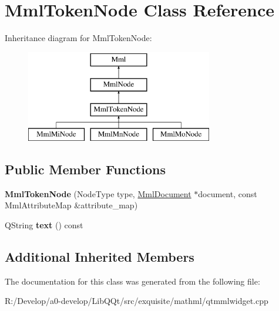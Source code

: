 \hypertarget{class_mml_token_node}{}\section{Mml\+Token\+Node Class Reference}
\label{class_mml_token_node}
Inheritance diagram for Mml\+Token\+Node\+:\begin{figure}[H]
\begin{center}
\leavevmode
\includegraphics[height=4.000000cm]{class_mml_token_node}
\end{center}
\end{figure}
\subsection*{Public Member Functions}
\begin{DoxyCompactItemize}
\item 
\mbox{\label{class_mml_token_node_ab7502878f01d33aca5f24a54fd884b11}} 
{\bfseries Mml\+Token\+Node} (Node\+Type type, \mbox{\hyperlink{class_mml_document}{Mml\+Document}} $\ast$document, const Mml\+Attribute\+Map \&attribute\+\_\+map)
\item 
\mbox{\label{class_mml_token_node_ac2caac4c9ae3d660dec12a65c660f6e0}} 
Q\+String {\bfseries text} () const
\end{DoxyCompactItemize}
\subsection*{Additional Inherited Members}


The documentation for this class was generated from the following file\+:\begin{DoxyCompactItemize}
\item 
R\+:/\+Develop/a0-\/develop/\+Lib\+Q\+Qt/src/exquisite/mathml/qtmmlwidget.\+cpp\end{DoxyCompactItemize}
